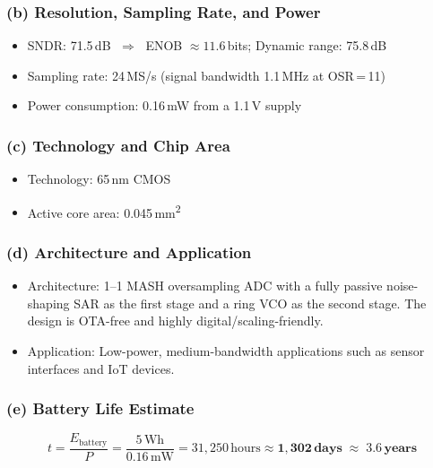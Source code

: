 \documentclass{article}
\begin{document}
  \subsubsection*{(b) Resolution, Sampling Rate, and Power}
  \begin{itemize}
      \item SNDR: 71.5\,dB $\;\Rightarrow\;$ ENOB $\approx 11.6$\,bits; Dynamic range: 75.8\,dB
      \item Sampling rate: 24\,MS/s (signal bandwidth 1.1\,MHz at OSR\,=\,11)
      \item Power consumption: 0.16\,mW from a 1.1\,V supply
  \end{itemize}

  \subsubsection*{(c) Technology and Chip Area}
  \begin{itemize}
      \item Technology: 65\,nm CMOS
      \item Active core area: 0.045\,mm\textsuperscript{2}
  \end{itemize}

  \subsubsection*{(d) Architecture and Application}
  \begin{itemize}
      \item Architecture: 1--1 MASH oversampling ADC with a fully passive noise-shaping SAR as the first stage and a ring VCO as
   the second stage. The design is OTA-free and highly digital/scaling-friendly.
      \item Application: Low-power, medium-bandwidth applications such as sensor interfaces and IoT devices.
  \end{itemize}

  \subsubsection*{(e) Battery Life Estimate}
  \[
      t = \frac{E_{\text{battery}}}{P} = \frac{5\,\text{Wh}}{0.16\,\text{mW}} = 31{,}250\,\text{hours} \approx
  \mathbf{1{,}302\,\text{days}\;\approx\;3.6\,\text{years}}
  \]

\end{document}
